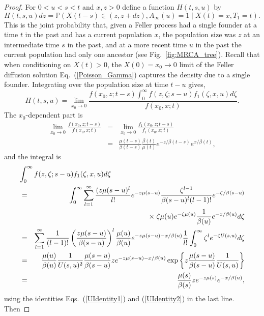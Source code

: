 \documentclass[preprint,12pt]{elsarticle}
\begin{document}
\begin{proof}
For $0 < u < s < t$ and $x, z > 0$ define a function $H(t, s, u)$ by 
\[
H(t, s, u) dz = \mathbb{P}(X(t- s) \in (z, z + dz), A_\infty(u) = 1 \mid X(t) = x, T_1 = t).  
\]
This is the joint probability that, given a Feller process had a single founder at a time $t$ in the past and has a 
current population $x$,  the population size was $z$ at an intermediate time $s$ in the past, and at a more recent time $u$ in the past the current population 
had only one ancestor (see Fig.~\ref{fig:MRCA_tree}).  Recall that when conditioning on $X(t) > 0$, the $X(0) = x_0 \to 0$ limit of the Feller diffusion solution 
Eq.~(\ref{Poisson_Gamma}) captures the density due to a single founder.  Integrating over the population size at time $t - u$ gives,  
\[
H(t, s, u) = \lim_{x_0 \to 0} \frac{f(x_0, z; t - s) \int_0^\infty f(z, \zeta; s - u)f_1(\zeta, x, u) d\zeta}{f(x_0, x; t)}. 
\]
The $x_0$-dependent part is 
\begin{eqnarray*}
\lim_{x_0 \to 0} \frac{f(x_0, z; t - s)}{f(x_0, x; t)} & = & \lim_{x_0 \to 0} \frac{f_1(x_0, z; t - s)}{f_1(x_0, x; t)} \nonumber \\
	& = & \frac{\mu(t - s)}{\beta(t - s)} \frac{\beta(t)}{\mu(t)} e^{-z/\beta(t - s)} e^{x/\beta(t)}, 
\end{eqnarray*}
and the integral is 
\begin{eqnarray*}
\lefteqn{\int_0^\infty f(z, \zeta; s - u)f_1(\zeta, x, u) d\zeta} \nonumber \\
	& = & \int_0^\infty \sum_{l = 1}^\infty \frac{(z\mu(s - u)^l}{l!} e^{-z\mu(s - u)} \frac{\zeta^{l - 1}}{\beta(s - u)^l (l - 1)!} e^{-\zeta/\beta(s - u)} \nonumber \\
	&&			\qquad\qquad	\times \; \zeta\mu(u) e^{-\zeta\mu(u)} \frac{1}{\beta(u)} e^{-x/\beta(u)} d\zeta \nonumber \\
	& = & \sum_{l = 1}^\infty \frac{1}{(l - 1)!} \left(\frac{z\mu(s - u)}{\beta(s - u)} \right)^l \frac{\mu(u)}{\beta(u)} e^{-z\mu(s - u) - x/\beta(u)} 
					\frac{1}{l!} \int_0^\infty \zeta^l e^{-\zeta U(s, u)} d\zeta \nonumber \\  
	& = & \frac{\mu(u)}{\beta(u)}\frac{1}{U(s, u)^2}\frac{\mu(s - u)}{\beta(s - u)} z e^{-z\mu(s - u) - x/\beta(u)} 
	                                 \exp\left\{z\frac{\mu(s - u)}{\beta(s - u)} \frac{1}{U(s, u)} \right\} \nonumber \\
	& = & \frac{\mu(s)}{\beta(s)} z e^{-z\mu(s)} e^{- x/\beta(u)}, 
\end{eqnarray*}
using the identities Eqs.~(\ref{UIdentity1}) and (\ref{UIdentity2}) in the last line.  Then

\end{proof}
\end{document}
